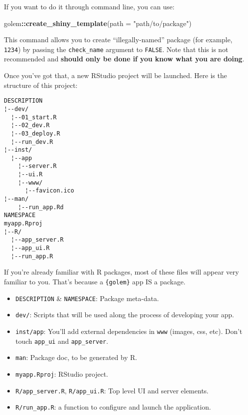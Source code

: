 \documentclass[]{book}
\newenvironment{Shaded}{\begin{snugshade}}{\end{snugshade}}
\newcommand{\DataTypeTok}[1]{\textcolor[rgb]{0.13,0.29,0.53}{#1}}
\newcommand{\KeywordTok}[1]{\textcolor[rgb]{0.13,0.29,0.53}{\textbf{#1}}}
\newcommand{\NormalTok}[1]{#1}
\newcommand{\OperatorTok}[1]{\textcolor[rgb]{0.81,0.36,0.00}{\textbf{#1}}}
\newcommand{\StringTok}[1]{\textcolor[rgb]{0.31,0.60,0.02}{#1}}
\begin{document}
If you want to do it through command line, you can use:

\begin{Shaded}
\begin{Highlighting}[]
\NormalTok{golem}\OperatorTok{::}\KeywordTok{create_shiny_template}\NormalTok{(}\DataTypeTok{path =} \StringTok{"path/to/package"}\NormalTok{)}
\end{Highlighting}
\end{Shaded}

This command allows you to create ``illegally-named'' package (for example, \texttt{1234}) by passing the \texttt{check\_name} argument to \texttt{FALSE}. Note that this is not recommended and \textbf{should only be done if you know what you are doing}.

Once you've got that, a new RStudio project will be launched. Here is the structure of this project:

\begin{verbatim}
DESCRIPTION               
¦--dev/          
  ¦--01_start.R           
  ¦--02_dev.R           
  ¦--03_deploy.R           
  ¦--run_dev.R
¦--inst/ 
  ¦--app                
    ¦--server.R       
    ¦--ui.R           
    ¦--www/          
      ¦--favicon.ico
¦--man/ 
    ¦--run_app.Rd      
NAMESPACE
myapp.Rproj
¦--R/ 
  ¦--app_server.R       
  ¦--app_ui.R           
  ¦--run_app.R      
\end{verbatim}

If you're already familiar with R packages, most of these files will appear very familiar to you. That's because a \texttt{\{golem\}} app IS a package.

\begin{itemize}
\item
  \texttt{DESCRIPTION} \& \texttt{NAMESPACE}: Package meta-data.
\item
  \texttt{dev/}: Scripts that will be used along the process of developing your app.
\item
  \texttt{inst/app}: You'll add external dependencies in \texttt{www} (images, css, etc). Don't touch \texttt{app\_ui} and \texttt{app\_server}.
\item
  \texttt{man}: Package doc, to be generated by R.
\item
  \texttt{myapp.Rproj}: RStudio project.
\item
  \texttt{R/app\_server.R}, \texttt{R/app\_ui.R}: Top level UI and server elements.
\item
  \texttt{R/run\_app.R}: a function to configure and launch the application.
\end{itemize}
\end{document}
